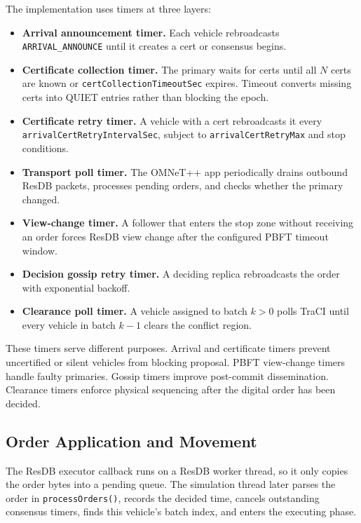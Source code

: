 \documentclass[fleqn,10pt]{olplainarticle}
\begin{document}
The implementation uses timers at three layers:

\begin{itemize}
    \item \textbf{Arrival announcement timer.} Each vehicle rebroadcasts \texttt{ARRIVAL\_ANNOUNCE} until it creates a cert or consensus begins.
    \item \textbf{Certificate collection timer.} The primary waits for certs until all $N$ certs are known or \texttt{certCollectionTimeoutSec} expires. Timeout converts missing certs into QUIET entries rather than blocking the epoch.
    \item \textbf{Certificate retry timer.} A vehicle with a cert rebroadcasts it every \texttt{arrivalCertRetryIntervalSec}, subject to \texttt{arrivalCertRetryMax} and stop conditions.
    \item \textbf{Transport poll timer.} The OMNeT++ app periodically drains outbound ResDB packets, processes pending orders, and checks whether the primary changed.
    \item \textbf{View-change timer.} A follower that enters the stop zone without receiving an order forces ResDB view change after the configured PBFT timeout window.
    \item \textbf{Decision gossip retry timer.} A deciding replica rebroadcasts the order with exponential backoff.
    \item \textbf{Clearance poll timer.} A vehicle assigned to batch $k>0$ polls TraCI until every vehicle in batch $k-1$ clears the conflict region.
\end{itemize}

These timers serve different purposes. Arrival and certificate timers prevent uncertified or silent vehicles from blocking proposal. PBFT view-change timers handle faulty primaries. Gossip timers improve post-commit dissemination. Clearance timers enforce physical sequencing after the digital order has been decided.

\subsection{Order Application and Movement}
\label{subsec:order-application}

The ResDB executor callback runs on a ResDB worker thread, so it only copies the order bytes into a pending queue. The simulation thread later parses the order in \texttt{processOrders()}, records the decided time, cancels outstanding consensus timers, finds this vehicle's batch index, and enters the executing phase.
\end{document}
